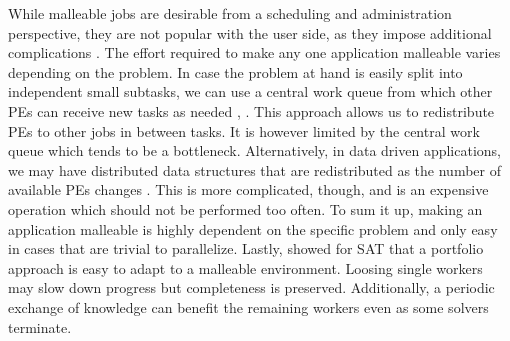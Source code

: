 While malleable jobs are desirable from a scheduling and administration perspective, they are not popular with the user side, as they impose additional complications \cite{feitelson1997job}. The effort required to make any one application malleable varies depending on the problem. In case the problem at hand is easily split into independent small subtasks, we can use a central work queue from which other PEs can receive new tasks as needed \cite{feitelson1997job}, \cite{tucker1989process}. This approach allows us to redistribute PEs to other jobs in between tasks. It is however limited by the central work queue which tends to be a bottleneck. Alternatively, in data driven applications, we may have distributed data structures that are redistributed as the number of available PEs changes \cite{feitelson1997job}. This is more complicated, though, and is an expensive operation which should not be performed too often. To sum it up, making an application malleable is highly dependent on the specific problem and only easy in cases that are trivial to parallelize. Lastly, \cite{schreiber2021scalable} showed for SAT that a portfolio approach is easy to adapt to a malleable environment. Loosing single workers may slow down progress but completeness is preserved. Additionally, a periodic exchange of knowledge can benefit the remaining workers even as some solvers terminate.

